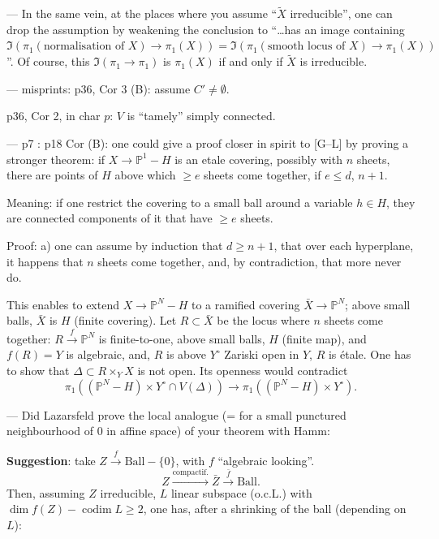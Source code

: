 \documentclass[11pt,a4paper]{article}
\theoremstyle{plain}
\theoremstyle{definition}
\DeclareMathOperator{\codim}{codim}
\begin{document}
--- In the same vein, at the places where you assume ``$\widetilde{X}$ irreducible'', one can drop the assumption by weakening the conclusion to ``\ldots has an image containing $\Im(\pi_1(\text{normalisation of } X) \to \pi_1(X)) = \Im(\pi_1(\text{smooth locus of } X) \to \pi_1(X))$''. Of course, this $\Im(\pi_1 \to \pi_1)$ is $\pi_1(X)$ if and only if $\widetilde{X}$ is irreducible.

\medskip

--- misprints: p36, Cor 3 (B): assume $C' \neq \emptyset$.

p36, Cor 2, in char $p$: $V$ is ``tamely'' simply connected.

\medskip

--- p7 : p18 Cor (B): one could give a proof closer in spirit to [G--L] by proving a stronger theorem: if $X \to \mathbb{P}^1 - H$ is an etale covering, possibly with $n$ sheets, there are points of $H$ above which $\geq e$ sheets come together, if $e \leq d$, $n+1$.

Meaning: if one restrict the covering to a small ball around a variable $h \in H$, they are connected components of it that have $\geq e$ sheets.

\newpage

Proof: a) one can assume by induction that $d \geq n+1$, that over each hyperplane, it happens that $n$ sheets come together, and, by contradiction, that more never do.

This enables to extend $X \to \mathbb{P}^N - H$ to a ramified covering $\bar{X} \to \mathbb{P}^N$; above small balls, $\bar{X}$ is $H$ (finite covering). Let $R \subset \bar{X}$ be the locus where $n$ sheets come together: $R \xrightarrow{f} \mathbb{P}^N$ is finite-to-one, above small balls, $H$ (finite map), and $f(R) = Y$ is algebraic, and, $R$ is above $Y^\circ$ Zariski open in $Y$, $R$ is \'etale. One has to show that $\Delta \subset R \times_Y X$ is not open. Its openness would contradict
\[
\pi_1((\mathbb{P}^N - H) \times Y^\circ \cap V(\Delta)) \longrightarrow \pi_1((\mathbb{P}^N - H) \times Y^\circ).
\]

\medskip

--- Did Lazarsfeld prove the local analogue (= for a small punctured neighbourhood of $0$ in affine space) of your theorem with Hamm:

\medskip

\noindent \textbf{Suggestion}: take $Z \xrightarrow{f} \text{Ball} - \{0\}$, with $f$ ``algebraic looking''.
\[
Z \xrightarrow{\text{compactif.}} \bar{Z} \xrightarrow{\bar{f}} \text{Ball}.
\]
Then, assuming $Z$ irreducible, $L$ linear subspace (o.c.L.) with $\dim f(Z) - \codim L \geq 2$, one has, after a shrinking of the ball (depending on $L$):
\end{document}
